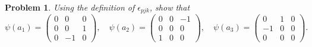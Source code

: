 \documentclass[UTF8,10pt,a4paper]{article}
\theoremstyle{Problem}
\newtheorem{prob}{Problem}
\theoremstyle{Solution}
\begin{document}
\begin{prob}
    Using the definition of $\epsilon_{pjk}$, show that
    \[
        \psi(a_1)=\left(\begin{matrix}
            0&0&0\\
            0&0&1\\
            0&-1&0
        \end{matrix}\right),\quad\psi(a_2)=\left(\begin{matrix}
            0&0&-1\\
            0&0&0\\
            1&0&0
        \end{matrix}\right),\quad\psi(a_3)=\left(\begin{matrix}
            0&1&0\\
            -1&0&0\\
            0&0&0
        \end{matrix}\right).
    \]
\end{prob}
\end{document}
